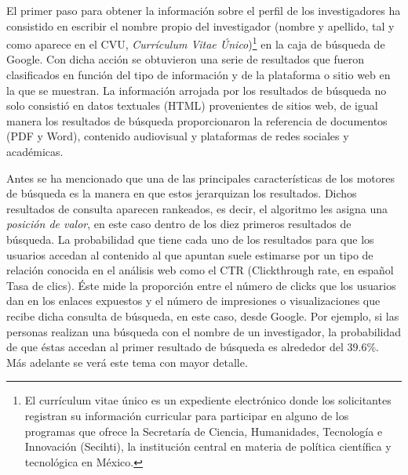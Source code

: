 \documentclass[
]{interact}
\begin{document}
El primer paso para obtener la información sobre el perfil de los
investigadores ha consistido en escribir el nombre propio del
investigador (nombre y apellido, tal y como aparece en el CVU,
\emph{Currículum Vitae Único})\footnote{El currículum vitae único es un
  expediente electrónico donde los solicitantes registran su información
  curricular para participar en alguno de los programas que ofrece la
  Secretaría de Ciencia, Humanidades, Tecnología e Innovación (Secihti),
  la institución central en materia de política científica y tecnológica
  en México.} en la caja de búsqueda de Google. Con dicha acción se
obtuvieron una serie de resultados que fueron clasificados en función
del tipo de información y de la plataforma o sitio web en la que se
muestran. La información arrojada por los resultados de búsqueda no solo
consistió en datos textuales (HTML) provenientes de sitios web, de igual
manera los resultados de búsqueda proporcionaron la referencia de
documentos (PDF y Word), contenido audiovisual y plataformas de redes
sociales y académicas.

Antes se ha mencionado que una de las principales características de los
motores de búsqueda es la manera en que estos jerarquizan los
resultados. Dichos resultados de consulta aparecen rankeados, es decir,
el algoritmo les asigna una \emph{posición de valor}, en este caso
dentro de los diez primeros resultados de búsqueda. La probabilidad que
tiene cada uno de los resultados para que los usuarios accedan al
contenido al que apuntan suele estimarse por un tipo de relación
conocida en el análisis web como el CTR (Clickthrough rate, en español
Tasa de clics). Éste mide la proporción entre el número de clicks que
los usuarios dan en los enlaces expuestos y el número de impresiones o
visualizaciones que recibe dicha consulta de búsqueda, en este caso,
desde Google. Por ejemplo, si las personas realizan una búsqueda con el
nombre de un investigador, la probabilidad de que éstas accedan al
primer resultado de búsqueda es alrededor del 39.6\%. Más adelante se
verá este tema con mayor detalle.
\end{document}
